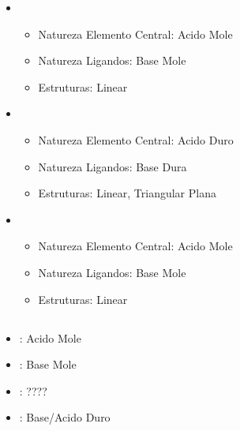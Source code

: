\documentclass[12pt]{article}
\begin{document}
\begin{itemize}

	\item {}
	
	\begin{itemize}
 		
		\item Natureza Elemento Central:
			Acido Mole
	
		\item Natureza Ligandos:
			Base Mole
			
		\item Estruturas:
			Linear
		
	\end{itemize}
	
	\item {}
	
	\begin{itemize}
 		
		\item Natureza Elemento Central:
			Acido Duro
			
		\item Natureza Ligandos:
			Base Dura
			
		\item Estruturas: Linear, Triangular Plana
			
	\end{itemize}
	
	\item {}
	
	\begin{itemize}
 		
		\item Natureza Elemento Central:
			Acido Mole
			
		\item Natureza Ligandos:
			Base Mole
			
		\item Estruturas: Linear
		
	\end{itemize}
	
\end{itemize}

\break

\subsection{}
\begin{itemize}
	
	\item {}: Acido Mole
	\item {}: Base Mole
	\item {}: ????
	\item {}: Base/Acido Duro
	
\end{itemize}
\end{document}

